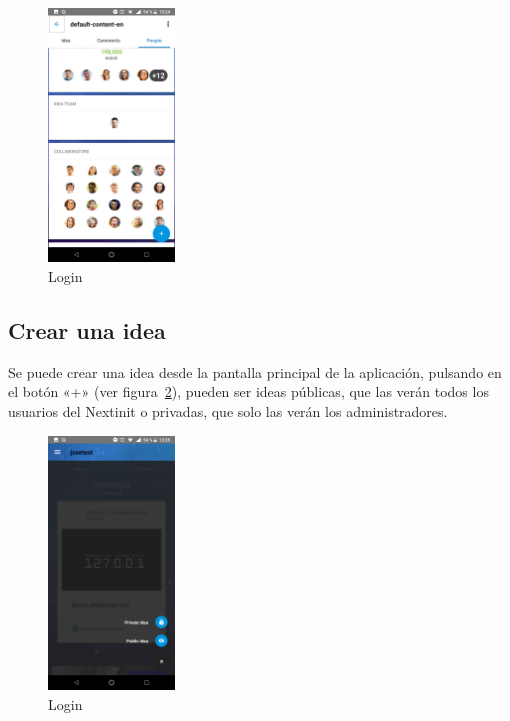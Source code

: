 \begin{figure}[!h]
	\begin{center}
		\includegraphics[width=0.3\textwidth]{./img/anexo1/ver_idea_gente_expandido.png}
		\caption{Login}
		\label{fig:ver_idea_gente_expandido}
	\end{center}
\end{figure}

\subsection{Crear una idea}

Se puede crear una idea desde la pantalla principal de la aplicación, pulsando en el botón 
«+» (ver figura~\ref{fig:inicio_crear_idea}), pueden ser ideas públicas, que las verán todos 
los usuarios del Nextinit o privadas, que solo las verán los administradores.

\begin{figure}[!h]
	\begin{center}
		\includegraphics[width=0.3\textwidth]{./img/anexo1/inicio_crear_idea.png}
		\caption{Login}
		\label{fig:inicio_crear_idea}
	\end{center}
\end{figure}

